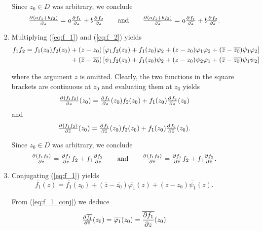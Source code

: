 \begin{enumerate}[label = \textbf{Exercise \arabic*.},wide = 0pt, itemsep=1.5ex]
\begin{enumerate}[label = (\roman*),wide = 0pt, itemsep=1.5ex]
				Since $z_0 \in D$ was arbitrary, we conclude
				\begin{equation}
					\pd{(af_1 + bf_2)}{z} = a\pd{f_1}{z} + b\pd{f_2}{z} \qquad \text{and} \qquad \pd{(af_1 + bf_2)}{\overline{z}} = a\pd{f_1}{\overline{z}} + b\pd{f_2}{\overline{z}}.
				\end{equation}

			\item Multiplying (\ref{eq:f_1}) and (\ref{eq:f_2}) yields
				\begin{align*}
					f_1f_2 = f_1(z_0)f_2(z_0) &+ (z - z_0) \sbr[0]{\varphi_1f_2(z_0) + f_1(z_0)\varphi_2 + (z - z_0)\varphi_1\varphi_2 + (\overline{z} - \overline{z_0})\psi_1\varphi_2}\\
					&+ (\overline{z} - \overline{z_0})\sbr[0]{\psi_1f_2(z_0) + f_1(z_0)\psi_2 + (z - z_0)\psi_2\varphi_1 + (\overline{z} - \overline{z_0})\psi_1\psi_2}
				\end{align*}

				\noindent where the argument $z$ is omitted. Clearly, the two functions in the square brackets are continuous at $z_0$ and evaluating them at $z_0$ yields
				\begin{equation}
					\pd{(f_1f_2)}{z}(z_0) = \pd{f_1}{z}(z_0)f_2(z_0) + f_1(z_0)\pd{f_2}{z}(z_0)
				\end{equation}
				\noindent and
				\begin{equation}
					\pd{(f_1f_2)}{\overline{z}}(z_0) = \pd{f_1}{\overline{z}}(z_0)f_2(z_0) + f_1(z_0)\pd{f_2}{\overline{z}}(z_0).
				\end{equation}

				Since $z_0 \in D$ was arbitrary, we conclude
				\begin{equation}
					\pd{(f_1f_2)}{z} = \pd{f_1}{z}f_2 + f_1\pd{f_2}{z} \qquad \text{and} \qquad \pd{(f_1f_2)}{\overline{z}} = \pd{f_1}{\overline{z}}f_2 + f_1\pd{f_2}{\overline{z}}.
				\end{equation}
			\item Conjugating (\ref{eq:f_1}) yields
				\begin{equation}
					\overline{f_1}(z) = \overline{f_1}(z_0) + (\overline{z} - \overline{z_0})\overline{\varphi_1}(z) + (z - z_0)\overline{\psi_1}(z).
					\label{eq:f_1_conj}
				\end{equation}

				From (\ref{eq:f_1_conj}) we deduce 
				\begin{equation}
					\pd{\overline{f_1}}{\overline{z}}(z_0) = \overline{\varphi_1}(z_0) = \overline{\frac{\partial f_1}{\partial z}}(z_0)
					\label{eq:conj}
				\end{equation}


\end{enumerate}
\end{enumerate}
